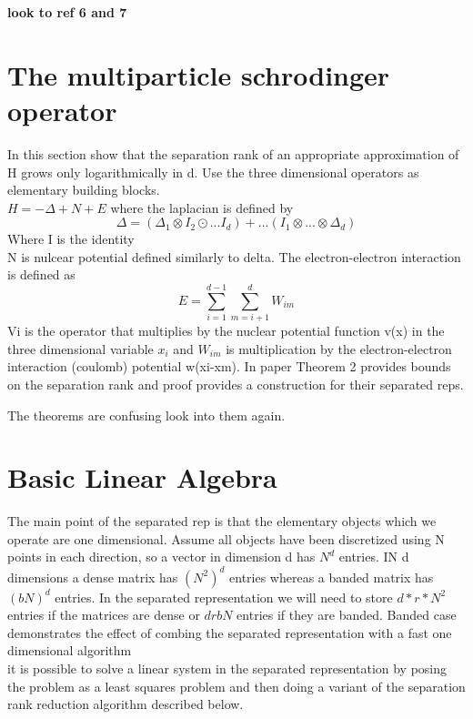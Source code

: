 \documentclass[10pt, draft]{article}
\begin{document}
\textbf{look to ref 6 and 7} \linebreak[1]

 \section{The multiparticle schrodinger operator}
 
In this section show that the separation rank of an appropriate approximation of H grows only logarithmically in d.  Use the three dimensional operators as elementary building blocks.  \\
$H = -\Delta + N + E $ where the laplacian is defined by 
\[\Delta = (\Delta_1 \otimes I_2 \odot ... I_d) + ... (I_1 \otimes ... \otimes \Delta _d) \] Where I is the identity \\
N is nulcear potential defined similarly to delta.  The electron-electron interaction is defined as 
\[E = \sum_{i=1}^{d-1} \sum_{m=i+1}^d W_{im}\]
Vi is the operator that multiplies by the nuclear potential function v(x) in the three dimensional variable $x_i$ and $W_{im}$ is multiplication by the electron-electron interaction (coulomb) potential w(xi-xm). In paper Theorem 2 provides bounds on the separation rank and proof provides a construction for their separated reps.\linebreak[1]

The theorems are confusing look into them again.  

\section{Basic Linear Algebra}
The main point of the separated rep is that the elementary objects which we operate are one dimensional.  Assume all objects have been discretized using N points in each direction, so a vector in dimension d has $N^d$ entries.  IN d dimensions a dense matrix has $(N^2)^d$ entries whereas a banded matrix has $(bN)^d$ entries.  In the separated representation we will need to store $d * r * N^2$ entries if the matrices are dense or $d r b N$ entries if they are banded.  Banded case demonstrates the effect of combing the separated representation with a fast one dimensional algorithm\\
it is possible to solve a linear system in the separated representation by posing the problem as a least squares problem and then doing a variant of the separation rank reduction algorithm described below.\\
\end{document}
